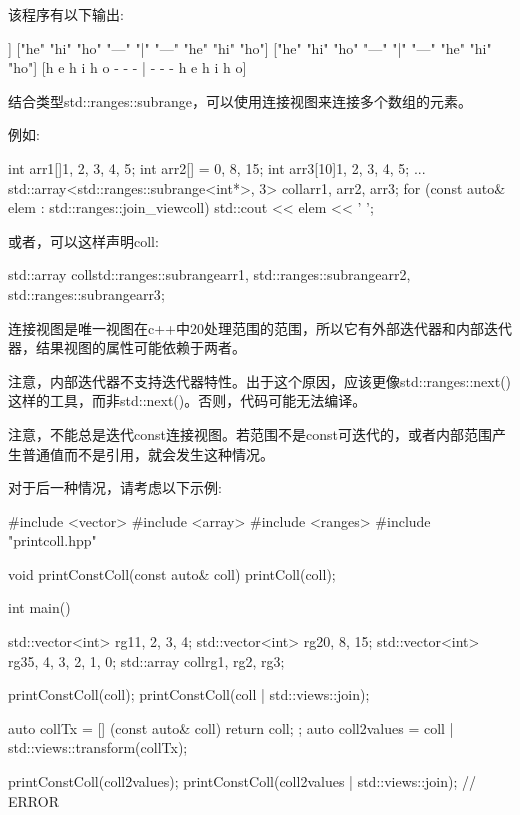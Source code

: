 该程序有以下输出:

\begin{shell}
[["he" "hi" "ho"] ["---" "|" "---"] ["he" "hi" "ho"]]
["he" "hi" "ho" "---" "|" "---" "he" "hi" "ho"]
["he" "hi" "ho" "---" "|" "---" "he" "hi" "ho"]
[h e h i h o - - - | - - - h e h i h o]
\end{shell}

结合类型std::ranges::subrange，可以使用连接视图来连接多个数组的元素。

例如:

\begin{cpp}
int arr1[]{1, 2, 3, 4, 5};
int arr2[] = {0, 8, 15};
int arr3[10]{1, 2, 3, 4, 5};
...
std::array<std::ranges::subrange<int*>, 3> coll{arr1, arr2, arr3};
for (const auto& elem : std::ranges::join_view{coll}) {
	std::cout << elem << ' ';
}
\end{cpp}

或者，可以这样声明coll:

\begin{cpp}
std::array coll{std::ranges::subrange{arr1},
				std::ranges::subrange{arr2},
				std::ranges::subrange{arr3}};
\end{cpp}

连接视图是唯一视图在c++中20处理范围的范围，所以它有外部迭代器和内部迭代器，结果视图的属性可能依赖于两者。

注意，内部迭代器不支持迭代器特性。出于这个原因，应该更像std::ranges::next()这样的工具，而非std::next()。否则，代码可能无法编译。


注意，不能总是迭代const连接视图。若范围不是const可迭代的，或者内部范围产生普通值而不是引用，就会发生这种情况。

对于后一种情况，请考虑以下示例:


\begin{cpp}
#include <vector>
#include <array>
#include <ranges>
#include "printcoll.hpp"

void printConstColl(const auto& coll)
{
	printColl(coll);
}

int main()
{
	std::vector<int> rg1{1, 2, 3, 4};
	std::vector<int> rg2{0, 8, 15};
	std::vector<int> rg3{5, 4, 3, 2, 1, 0};
	std::array coll{rg1, rg2, rg3};
	
	printConstColl(coll);
	printConstColl(coll | std::views::join);
	
	auto collTx = [] (const auto& coll) { return coll; };
	auto coll2values = coll | std::views::transform(collTx);
	
	printConstColl(coll2values);
	printConstColl(coll2values | std::views::join); // ERROR
}
\end{cpp}

